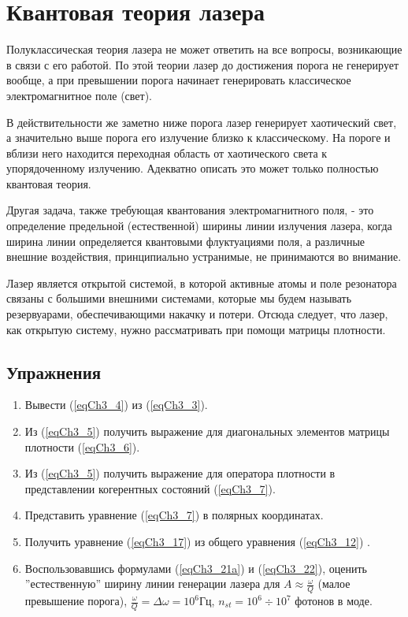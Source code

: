 \chapter{Квантовая теория лазера}
\label{chLaser}

Полуклассическая теория лазера не может ответить на все вопросы,
возникающие в связи с его работой. По этой теории лазер до достижения
порога  не генерирует вообще, а при превышении порога начинает
генерировать классическое электромагнитное поле (свет). 

В действительности же заметно ниже порога лазер генерирует хаотический
свет, а значительно выше порога его излучение близко к
классическому. На пороге и вблизи него находится переходная область от
хаотического света к упорядоченному излучению. Адекватно описать это
может только полностью квантовая теория. 

Другая задача, также требующая квантования электромагнитного поля, -
это определение предельной (естественной) ширины линии излучения
лазера, когда ширина линии определяется квантовыми флуктуациями поля,
а различные внешние воздействия, принципиально устранимые, не
принимаются во внимание. 

Лазер является открытой системой, в которой активные атомы и поле
резонатора связаны с большими внешними системами, которые мы будем
называть резервуарами, обеспечивающими накачку и потери. 
Отсюда следует, что лазер, как открытую систему, нужно рассматривать
при помощи матрицы плотности.  






\section{Упражнения}
\begin{enumerate}
\item Вывести (\ref{eqCh3_4}) из (\ref{eqCh3_3}).
\item Из (\ref{eqCh3_5}) получить выражение для диагональных элементов
  матрицы плотности (\ref{eqCh3_6}).
\item Из (\ref{eqCh3_5}) получить выражение для оператора плотности в
  представлении когерентных состояний (\ref{eqCh3_7}).
\item Представить уравнение (\ref{eqCh3_7}) в полярных координатах.
\item Получить уравнение (\ref{eqCh3_17}) из общего уравнения
  (\ref{eqCh3_12}) .
\item Воспользовавшись формулами (\ref{eqCh3_21a}) и (\ref{eqCh3_22}),
  оценить ''естественную'' ширину линии генерации лазера для $A
  \approx \frac{\omega}{Q}$ (малое превышение порога), 
$\frac{\omega}{Q} = \Delta \omega = 10^6 \mbox{Гц}$, 
$n_{st} = 10^6 \div 10^7$ фотонов в моде. 
\end{enumerate}

